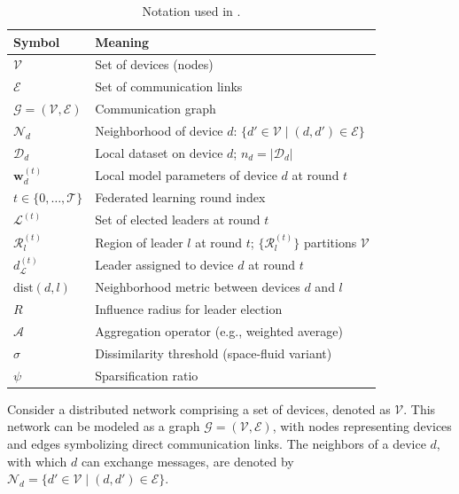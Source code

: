 \begin{table}[htbp]
  \centering
  \caption{Notation used in .}
  \label{tab:selforgfl-notation}
  \begin{tabular}{ll}
    \toprule
    Symbol & Meaning \\
    \midrule
    $\mathcal{V}$ & Set of devices (nodes) \\
    $\mathcal{E}$ & Set of communication links \\
    $\mathcal{G} = (\mathcal{V}, \mathcal{E})$ & Communication graph \\
    $\mathcal{N}_d$ & Neighborhood of device $d$: $\{d' \in \mathcal{V} \mid (d,d') \in \mathcal{E}\}$ \\
    $\mathcal{D}_d$ & Local dataset on device $d$; $n_d = |\mathcal{D}_d|$ \\
    $\mathbf{w}_d^{(t)}$ & Local model parameters of device $d$ at round $t$ \\
    $t \in \{0, \ldots, \mathcal{T}\}$ & Federated learning round index \\
    $\mathcal{L}^{(t)}$ & Set of elected leaders at round $t$ \\
    $\mathcal{R}_l^{(t)}$ & Region of leader $l$ at round $t$; $\{\mathcal{R}_l^{(t)}\}$ partitions $\mathcal{V}$ \\
    $d_{\mathcal{L}}^{(t)}$ & Leader assigned to device $d$ at round $t$ \\
    $\mathrm{dist}(d, l)$ & Neighborhood metric between devices $d$ and $l$ \\
    $R$ & Influence radius for leader election \\
    $\mathcal{A}$ & Aggregation operator (e.g., weighted average) \\
    $\sigma$ & Dissimilarity threshold (space-fluid variant) \\
    $\psi$ & Sparsification ratio \\
    \bottomrule
  \end{tabular}
\end{table}


Consider a distributed network comprising a set of devices, 
 denoted as $\mathcal{V}$.
%
This network can be modeled as a graph $\mathcal{G} = (\mathcal{V}, \mathcal{E})$,
 with nodes representing devices and edges symbolizing direct communication links. 
%
The neighbors of a device $d$, with which $d$ can exchange messages, 
 are denoted by $\mathcal{N}_d = \{d' \in \mathcal{V} \mid (d, d') \in \mathcal{E}\}$.

